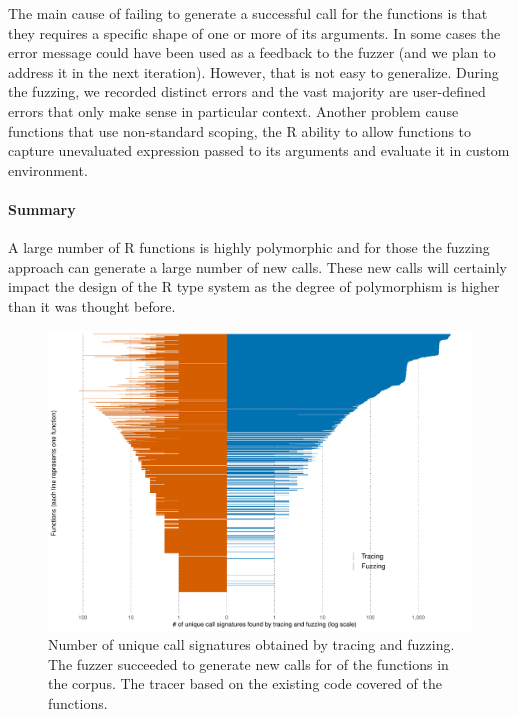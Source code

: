 \documentclass[sigplan,anonymous,review]{acmart}
\begin{document}
The main cause of failing to generate a successful call for the \UFNumMissingFunctionSignatr functions is that they requires a specific shape of one or more of its arguments.
In some cases the error message could have been used as a feedback to the fuzzer (and we plan to address it in the next iteration).
However, that is not easy to generalize.
During the fuzzing, we recorded \UFNumErrorMessagesRnd distinct errors and the vast majority are user-defined errors that only make sense in particular context.
Another problem cause functions that use non-standard scoping, the R ability to allow functions to capture unevaluated expression passed to its arguments and evaluate it in custom environment.

\paragraph{Summary}

A large number of R functions is highly polymorphic and for those the fuzzing approach can generate a large number of new calls.
These new calls will certainly impact the design of the R type system as the degree of polymorphism is higher than it was thought before.



\begin{figure}
    \centering
    \includegraphics[width=\columnwidth]{code-and-figures/uf-call-signatures.pdf}
    \caption{Number of unique call signatures obtained by tracing and fuzzing. The fuzzer succeeded to generate new calls for \UFNumFunctionSignatrSignatureRatio of the functions in the corpus. The tracer based on the existing code covered \UFNumFunctionBaselineSignatureRatio of the functions.}
    \label{fig:call-signatures}
\end{figure}
\end{document}
